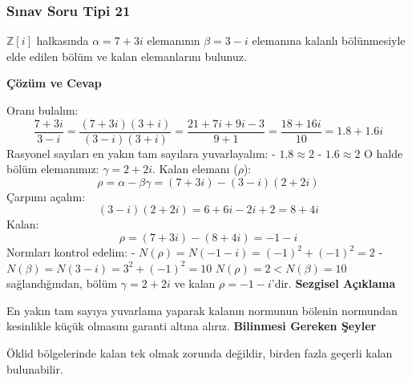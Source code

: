 \documentclass[11pt, a4paper]{article}
\newenvironment{cozum}{
    \vspace{0.5cm}
    \noindent\textcolor{green!60!black}{\faCheckCircle\enspace \textbf{\Large Çözüm ve Cevap}}\par\vspace{0.2cm}
}{}
\newenvironment{sezgisel}{
    \vspace{0.5cm}
    \noindent\textcolor{orange!80!black}{\faLightbulb\enspace \textbf{\Large Sezgisel Açıklama}}\par\vspace{0.2cm}
    \itshape
}{}
\newenvironment{bilgi}{
    \vspace{0.5cm}
    \noindent\textcolor{red!70!black}{\faExclamationTriangle\enspace \textbf{\Large Bilinmesi Gereken Şeyler}}\par\vspace{0.2cm}
}{}
\begin{document}
\subsubsection{Sınav Soru Tipi 21}
\begin{sinavbox}
$\mathbb{Z}[i]$ halkasında $\alpha = 7+3i$ elemanının $\beta = 3-i$ elemanına kalanlı bölünmesiyle elde edilen bölüm ve kalan elemanlarını bulunuz.
\end{sinavbox}
\begin{cozum}
Oranı bulalım:
\[ \frac{7+3i}{3-i} = \frac{(7+3i)(3+i)}{(3-i)(3+i)} = \frac{21 + 7i + 9i - 3}{9+1} = \frac{18+16i}{10} = 1.8 + 1.6i \]
Rasyonel sayıları en yakın tam sayılara yuvarlayalım:
- $1.8 \approx 2$
- $1.6 \approx 2$
O halde bölüm elemanımız: $\gamma = 2+2i$.
Kalan elemanı ($\rho$):
\[ \rho = \alpha - \beta\gamma = (7+3i) - (3-i)(2+2i) \]
Çarpımı açalım:
\[ (3-i)(2+2i) = 6 + 6i - 2i + 2 = 8 + 4i \]
Kalan:
\[ \rho = (7+3i) - (8+4i) = -1 - i \]
Normları kontrol edelim:
- $N(\rho) = N(-1-i) = (-1)^2+(-1)^2 = 2$
- $N(\beta) = N(3-i) = 3^2+(-1)^2 = 10$
$N(\rho) = 2 < N(\beta) = 10$ sağlandığından, bölüm $\gamma = 2+2i$ ve kalan $\rho = -1-i$'dir.
\end{cozum}
\begin{sezgisel}
En yakın tam sayıya yuvarlama yaparak kalanın normunun bölenin normundan kesinlikle küçük olmasını garanti altına alırız.
\end{sezgisel}
\begin{bilgi}
Öklid bölgelerinde kalan tek olmak zorunda değildir, birden fazla geçerli kalan bulunabilir.
\end{bilgi}

\newpage
\end{document}

